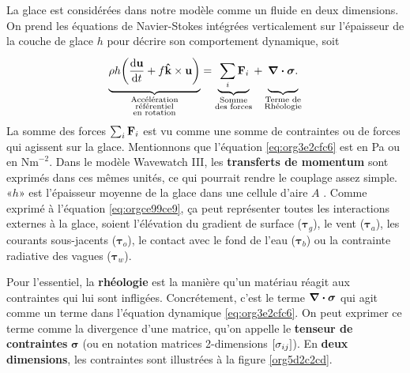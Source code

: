 \documentclass[10pt]{article}
\numberwithin{equation}{section}
\newcommand{\kvf}{\vb{\hat{k}}}
\newcommand{\uu}{\vb{u}}
\newcommand{\venti}{\vphantom{\sum_x^x}}
\begin{document}
La glace est considérées dans notre modèle comme un fluide en deux dimensions.
On prend les équations de Navier-Stokes intégrées verticalement sur l'épaisseur de la couche de glace \(h\) pour décrire son comportement dynamique, soit
\begin{equation}
\label{eq:org3e2cfc6}
    \underbrace{\venti\rho h\qty(\dv{\uu}{t} + f\kvf\times\uu)}_{\substack{\text{Accélération}\\\text{référentiel}\\\text{en rotation}}}
   =\underbrace{\venti\sum_i\vb{F}_i}_{\substack{\text{Somme}\\\text{des forces}}}
   +\underbrace{\venti\divergence{\boldsymbol{\sigma}}.}_{\substack{\text{Terme de}\\\text{Rhéologie}}}
\end{equation}
La somme des forces \(\sum_i \vb{F}_i\) est vu comme une somme de contraintes ou de forces qui agissent sur la glace.
Mentionnons que l'équation \ref{eq:org3e2cfc6} est en Pa ou en \(\text{Nm}^{-2}\).
Dans le modèle Wavewatch III, les \textbf{transferts de momentum} sont exprimés dans ces mêmes unités, ce qui pourrait rendre le couplage assez simple.
«\(h\)» est l'épaisseur moyenne de la glace dans une cellule d'aire \(A\) \autocite[voir][pour un aperçu]{dumont2022marginal}. 
Comme exprimé à l'équation \ref{eq:orgce99ce9}, ça peut représenter toutes les interactions externes à la glace, soient l'élévation du gradient de surface (\(\boldsymbol{\tau}_g\)), le vent (\(\boldsymbol{\tau}_a\)), les courants sous-jacents (\(\boldsymbol{\tau}_o\)), le contact avec le fond de l'eau (\(\boldsymbol{\tau}_b\)) ou la contrainte radiative des vagues (\(\boldsymbol{\tau}_w\)).\bigskip

Pour l'essentiel, la \textbf{rhéologie} est la manière qu'un matériau réagit aux contraintes qui lui sont infligées.
Concrétement, c'est le terme \(\divergence{\boldsymbol{\sigma}}\) qui agit comme un terme dans l'équation dynamique \ref{eq:org3e2cfc6}. 
On peut exprimer ce terme comme la divergence d'une matrice, qu'on appelle le \textbf{tenseur de contraintes} \(\boldsymbol{\sigma}\) (ou en notation matrices 2-dimensions \(\qty[\sigma_{ij}]\)).
En \textbf{deux dimensions}, les contraintes sont illustrées à la figure \ref{org5d2c2cd}.\bigskip
\end{document}
